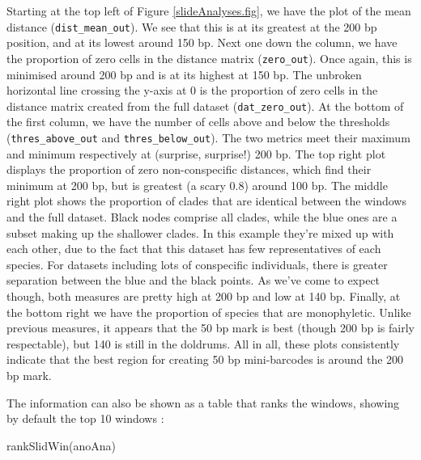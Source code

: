 \documentclass{article}
\begin{document}
Starting at the top left of Figure \ref{slideAnalyses.fig}, we have the plot of the mean distance (\verb|dist_mean_out|). We see that this is at its greatest at the 200 bp position, and at its lowest around 150 bp. Next one down the column, we have the proportion of zero cells in the distance matrix (\verb|zero_out|). Once again, this is minimised around 200 bp and is at its highest at 150 bp. The unbroken horizontal line crossing the y-axis at 0 is the proportion of zero cells in the distance matrix created from the full dataset (\verb|dat_zero_out|). At the bottom of the first column, we have the number of cells above and below the thresholds (\verb|thres_above_out| and \verb|thres_below_out|). The two metrics meet their maximum and minimum respectively at (surprise, surprise!) 200 bp. The top right plot displays the proportion of zero non-conspecific distances, which find their minimum at 200 bp, but is greatest (a scary 0.8) around 100 bp. The middle right plot shows the proportion of clades that are identical between the windows and the full dataset. Black nodes comprise all clades, while the blue ones are a subset making up the shallower clades. In this example they're mixed up with each other, due to the fact that this dataset has few representatives of each species. For datasets including lots of conspecific individuals, there is greater separation between the blue and the black points. As we've come to expect though, both measures are pretty high at 200 bp and low at 140 bp. Finally, at the bottom right we have the proportion of species that are monophyletic. Unlike previous measures, it appears that the 50 bp mark is best (though 200 bp is fairly respectable), but 140 is still in the doldrums. All in all, these plots consistently indicate that the best region for creating 50 bp mini-barcodes is around the 200 bp mark.

The information can also be shown as a table that ranks the windows, showing by default the top 10 windows :

\begin{console}
rankSlidWin(anoAna)
\end{console}
\end{document}
